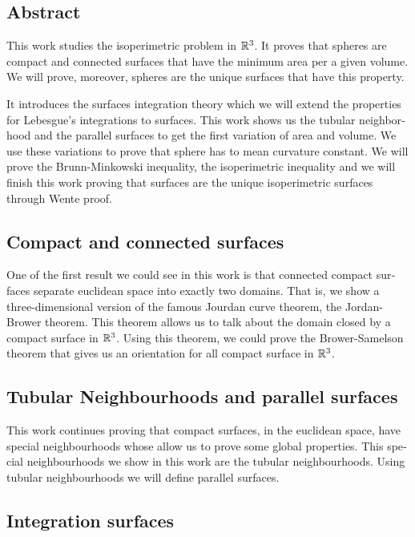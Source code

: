 \begin{otherlanguage}{american}
\section{Abstract}

This work studies the isoperimetric problem in $\mathbb{R}^3$. It proves that spheres are compact and connected surfaces that have the minimum area per a given volume. We will prove, moreover, spheres are the unique surfaces that have this property.

It introduces the surfaces integration theory which we will extend the properties for Lebesgue's integrations to surfaces. This work shows us the tubular neighborhood and the parallel surfaces to get the first variation of area and volume. We use these variations to prove that sphere has to mean curvature constant. We will prove the Brunn-Minkowski inequality, the isoperimetric inequality and we will finish this work proving that surfaces are the unique isoperimetric surfaces through Wente proof.


\subsection{Compact and connected surfaces}

One of the first result we could see in this work is that connected compact surfaces separate euclidean space into exactly two domains. That is, we show a three-dimensional version of the famous Jourdan curve theorem, the Jordan-Brower theorem. This theorem allows us to talk about the domain closed by a compact surface in $\mathbb{R}^3$. Using this theorem, we could prove the Brower-Samelson theorem that gives us an orientation for all compact surface in $\mathbb{R}^3$.

\subsection{Tubular Neighbourhoods and parallel surfaces}

This work continues proving that compact surfaces, in the euclidean space, have special neighbourhoods whose allow us to prove some global properties. This special neighbourhoods we show in this work are the tubular neighbourhoods. Using tubular neighbourhoods we will define parallel surfaces.

\subsection{Integration surfaces}


\end{otherlanguage}
